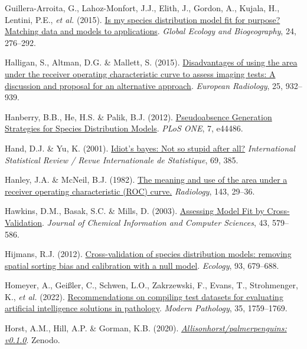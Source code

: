 \documentclass[
  letterpaper,
]{scrbook}
\newlength{\cslhangindent}
\newenvironment{CSLReferences}[2] %
 {\begin{list}{}{%
  \setlength{\itemindent}{0pt}
  \setlength{\leftmargin}{0pt}
  \setlength{\parsep}{0pt}
  \ifodd #1
   \setlength{\leftmargin}{\cslhangindent}
   \setlength{\itemindent}{-1\cslhangindent}
  \fi
  \setlength{\itemsep}{#2\baselineskip}}}
 {\end{list}}
\begin{document}
\begin{CSLReferences}{1}{0}
Guillera-Arroita, G., Lahoz-Monfort, J.J., Elith, J., Gordon, A.,
Kujala, H., Lentini, P.E., \emph{et al.} (2015).
\href{https://doi.org/10.1111/geb.12268}{Is my species distribution
model fit for purpose? Matching data and models to applications}.
\emph{Global Ecology and Biogeography}, 24, 276--292.

Halligan, S., Altman, D.G. \& Mallett, S. (2015).
\href{https://doi.org/10.1007/s00330-014-3487-0}{Disadvantages of using
the area under the receiver operating characteristic curve to assess
imaging tests: A discussion and proposal for an alternative approach}.
\emph{European Radiology}, 25, 932--939.

Hanberry, B.B., He, H.S. \& Palik, B.J. (2012).
\href{https://doi.org/10.1371/journal.pone.0044486}{Pseudoabsence
Generation Strategies for Species Distribution Models}. \emph{PLoS ONE},
7, e44486.

Hand, D.J. \& Yu, K. (2001).
\href{https://doi.org/10.2307/1403452}{Idiot's bayes: Not so stupid
after all?} \emph{International Statistical Review / Revue
Internationale de Statistique}, 69, 385.

Hanley, J.A. \& McNeil, B.J. (1982).
\href{https://doi.org/10.1148/radiology.143.1.7063747}{The meaning and
use of the area under a receiver operating characteristic (ROC) curve.}
\emph{Radiology}, 143, 29--36.

Hawkins, D.M., Basak, S.C. \& Mills, D. (2003).
\href{https://doi.org/10.1021/ci025626i}{Assessing Model Fit by
Cross-Validation}. \emph{Journal of Chemical Information and Computer
Sciences}, 43, 579--586.

Hijmans, R.J. (2012).
\href{https://doi.org/10.1890/11-0826.1}{Cross-validation of species
distribution models: removing spatial sorting bias and calibration with
a null model}. \emph{Ecology}, 93, 679--688.

Homeyer, A., Geißler, C., Schwen, L.O., Zakrzewski, F., Evans, T.,
Strohmenger, K., \emph{et al.} (2022).
\href{https://doi.org/10.1038/s41379-022-01147-y}{Recommendations on
compiling test datasets for evaluating artificial intelligence solutions
in pathology}. \emph{Modern Pathology}, 35, 1759--1769.

Horst, A.M., Hill, A.P. \& Gorman, K.B. (2020).
\emph{\href{https://doi.org/10.5281/ZENODO.3960218}{Allisonhorst/palmerpenguins:
v0.1.0}}. Zenodo.


\end{CSLReferences}
\end{document}
